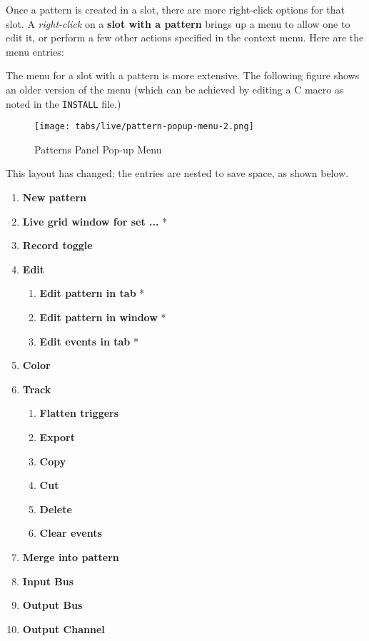    Once a pattern is created in a slot, there are more
   right-click options for that slot.
   A \textsl{right-click} on a \textbf{slot with a pattern} brings up a menu
   to allow one to edit it, or perform a few other actions
   specified in the context menu.  Here are the menu entries:


   The menu for a slot with a pattern is more extensive. The following
   figure shows an older version of the menu (which can be achieved
   by editing a C macro as noted in the \texttt{INSTALL} file.)

\begin{figure}[H]
   \centering 
   \texttt{[image: tabs/live/pattern-popup-menu-2.png]}
   \caption{Patterns Panel Pop-up Menu}
   \label{fig:patterns_panel_popup_menu}
\end{figure}

   This layout has changed; the entries are nested to save space, as
   shown below.

   \begin{enumerate}
      \item \textbf{New pattern}
      \item \textbf{Live grid window for set ...} *
      \item \textbf{Record toggle}
      \item \textbf{Edit}
      \begin{enumerate}
         \item \textbf{Edit pattern in tab} *
         \item \textbf{Edit pattern in window} *
         \item \textbf{Edit events in tab} *
      \end{enumerate}
      \item \textbf{Color}
      \item \textbf{Track}
      \begin{enumerate}
         \item \textbf{Flatten triggers}
         \item \textbf{Export}
         \item \textbf{Copy}
         \item \textbf{Cut}
         \item \textbf{Delete}
         \item \textbf{Clear events}
      \end{enumerate}
      \item \textbf{Merge into pattern}
      \item \textbf{Input Bus}
      \item \textbf{Output Bus}
      \item \textbf{Output Channel}
   \end{enumerate}

